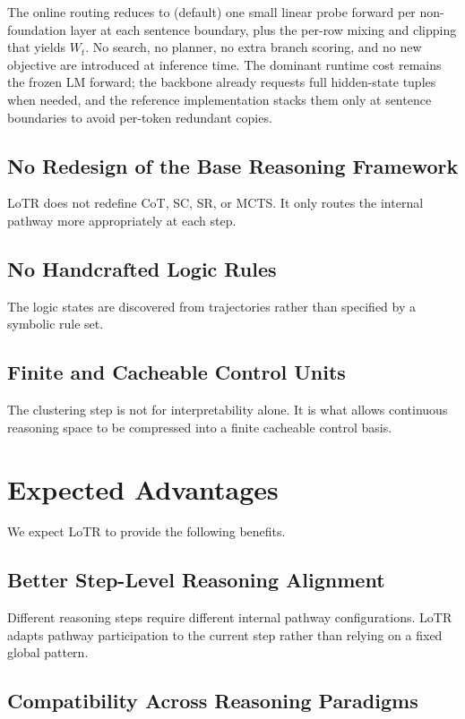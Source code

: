 \documentclass[11pt]{article}
\begin{document}
The online routing reduces to (default) one small linear probe forward per non-foundation layer at each sentence boundary, plus the per-row mixing and clipping that yields $W_t$. No search, no planner, no extra branch scoring, and no new objective are introduced at inference time. The dominant runtime cost remains the frozen LM forward; the backbone already requests full hidden-state tuples when needed, and the reference implementation stacks them only at sentence boundaries to avoid per-token redundant copies.

\subsection{No Redesign of the Base Reasoning Framework}

LoTR does not redefine CoT, SC, SR, or MCTS. It only routes the internal pathway more appropriately at each step.

\subsection{No Handcrafted Logic Rules}

The logic states are discovered from trajectories rather than specified by a symbolic rule set.

\subsection{Finite and Cacheable Control Units}

The clustering step is not for interpretability alone. It is what allows continuous reasoning space to be compressed into a finite cacheable control basis.

\section{Expected Advantages}

We expect LoTR to provide the following benefits.

\subsection{Better Step-Level Reasoning Alignment}

Different reasoning steps require different internal pathway configurations. LoTR adapts pathway participation to the current step rather than relying on a fixed global pattern.

\subsection{Compatibility Across Reasoning Paradigms}
\end{document}
